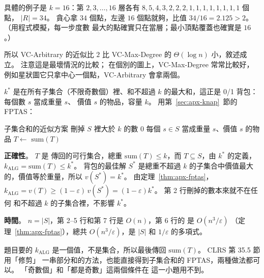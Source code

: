 具體的例子是 $k = 16$：第 $2, 3, \ldots, 16$ 層各有 $8, 5, 4, 3, 2, 2, 2, 1, 1, 1, 1, 1, 1, 1, 1$ 個點，
$|R| = 34$。 貪心拿 $34$ 個點，左邊 $16$ 個點就夠，比值 $34/16 = 2.125 > 2$。 （用程式模擬，每一步度數
最大的點確實只在當層；最小頂點覆蓋也確實是 $16$。）

所以 VC-Arbitrary 的近似比 $2$ 比 VC-Max-Degree 的 $\Theta(\log n)$ 小，敘述成立。 注意這是最壞情況的比較；
在個別的圖上，VC-Max-Degree 常常比較好，例如星狀圖它只拿中心一個點，VC-Arbitrary 會拿兩個。

$k^*$ 是在所有子集合（不限奇數個）裡、和不超過 $k$ 的最大和，這正是 0/1 背包：每個數 $s$ 當成重量 $s$、
價值 $s$ 的物品，容量 $k$。 用第~\ref{sec:apx-knap}~節的 FPTAS：

\begin{pseudo}[label=alg:apx-px-subset]{子集合和的近似方案}
    \State 刪掉 $S$ 裡大於 $k$ 的數
        \State \Return $0$ 
    \EndIf
    \State 每個 $s \in S$ 當成重量 $s$、價值 $s$ 的物品
    \State $T \gets$ 
    \State \Return $\mathrm{sum}(T)$
\EndFunction
\end{pseudo}

\textbf{正確性}。 $T$ 是  傳回的可行集合，總重 $\mathrm{sum}(T) \le k$，而
$T \subseteq S$，由 $k^*$ 的定義，$k_{\mathrm{ALG}} = \mathrm{sum}(T) \le k^*$。 背包的最佳解 $S^*$ 是總重不超過
$k$ 的子集合中價值最大的，價值等於重量，所以 $v(S^*) = k^*$。 由定理~\ref{thm:apx-fptas}，
$k_{\mathrm{ALG}} = v(T) \ge (1 - \varepsilon)\, v(S^*) = (1 - \varepsilon) k^*$。 第 2 行刪掉的數本來就不在任何
和不超過 $k$ 的子集合裡，不影響 $k^*$。

\textbf{時間}。 $n = |S|$，第 2--5 行和第 7 行是 $O(n)$，第 6 行的  是 $O(n^3/\varepsilon)$
（定理~\ref{thm:apx-fptas}），總共 $O(n^3/\varepsilon)$，是 $|S|$ 和 $1/\varepsilon$ 的多項式。

題目要的 $k_{\mathrm{ALG}}$ 是一個值，不是集合，所以最後傳回 $\mathrm{sum}(T)$。 CLRS 第 35.5 節用「修剪」
一串部分和的方法，也能直接得到子集合和的 FPTAS，兩種做法都可以。 「奇數個」和「都是奇數」這兩個條件在
這一小題用不到。
